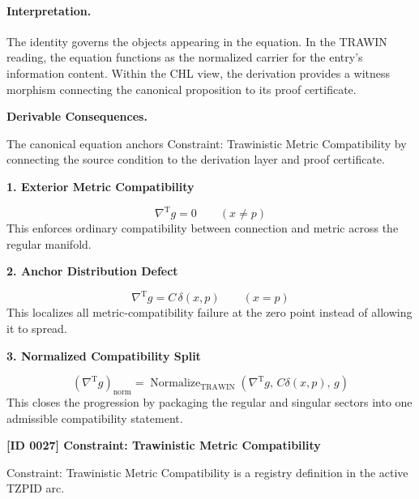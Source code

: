 \paragraph{Interpretation.}
The identity governs the objects appearing in the equation. In the TRAWIN reading, the equation functions as the normalized carrier for the entry’s information content. Within the CHL view, the derivation provides a witness morphism connecting the canonical proposition to its proof certificate.

\par\vspace{0.35em}
\noindent\textbf{Derivable Consequences.}\quad
\begingroup
\footnotesize
\raggedright
The canonical equation anchors Constraint: Trawinistic Metric Compatibility by connecting the source condition to the derivation layer and proof certificate.
\par\endgroup

\noindent\textbf{1. Exterior Metric Compatibility}\par
\[
\nabla^{\mathrm{T}} g = 0
\qquad (x\neq p)
\]
\noindent This enforces ordinary compatibility between connection and metric across the regular manifold.\par
\noindent\textbf{2. Anchor Distribution Defect}\par
\[
\nabla^{\mathrm{T}} g = C\,\delta(x,p)
\qquad (x=p)
\]
\noindent This localizes all metric-compatibility failure at the zero point instead of allowing it to spread.\par
\noindent\textbf{3. Normalized Compatibility Split}\par
\[
\left(\nabla^{\mathrm{T}} g\right)_{\mathrm{norm}}
=
\operatorname{Normalize}_{\mathrm{TRAWIN}}
\!\left(
\nabla^{\mathrm{T}} g,\,
C\delta(x,p),\,
g
\right)
\]
\noindent This closes the progression by packaging the regular and singular sectors into one admissible compatibility statement.\par

\clearpage
\noindent\textbf{[ID 0027] Constraint: Trawinistic Metric Compatibility}\par
\vspace{0.35em}
\begingroup\small
{}
Constraint: Trawinistic Metric Compatibility is a registry definition in the active TZPID arc.


